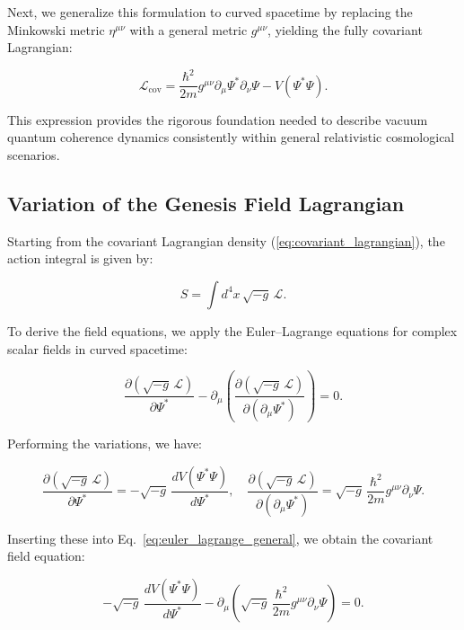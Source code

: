 Next, we generalize this formulation to curved spacetime by replacing the Minkowski metric $\eta^{\mu\nu}$ with a general metric $g^{\mu\nu}$, yielding the fully covariant Lagrangian:

\begin{equation}
\mathcal{L}_{\text{cov}} = \frac{\hbar^2}{2m}g^{\mu\nu}\partial_\mu\Psi^*\partial_\nu\Psi - V(\Psi^*\Psi).
\label{eq:covariant_lagrangian}
\end{equation}

This expression provides the rigorous foundation needed to describe vacuum quantum coherence dynamics consistently within general relativistic cosmological scenarios.

\subsection{Variation of the Genesis Field Lagrangian}

Starting from the covariant Lagrangian density (\ref{eq:covariant_lagrangian}), the action integral is given by:

\begin{equation}
S = \int d^4x \,\sqrt{-g}\,\mathcal{L}.
\label{eq:action_covariant}
\end{equation}

To derive the field equations, we apply the Euler–Lagrange equations for complex scalar fields in curved spacetime:

\begin{equation}
\frac{\partial (\sqrt{-g}\,\mathcal{L})}{\partial \Psi^*} - \partial_\mu \left(\frac{\partial (\sqrt{-g}\,\mathcal{L})}{\partial (\partial_\mu \Psi^*)}\right) = 0.
\label{eq:euler_lagrange_general}
\end{equation}

Performing the variations, we have:

\begin{equation}
\frac{\partial(\sqrt{-g}\,\mathcal{L})}{\partial \Psi^*} = -\sqrt{-g}\,\frac{dV(\Psi^*\Psi)}{d\Psi^*}, \quad
\frac{\partial(\sqrt{-g}\,\mathcal{L})}{\partial(\partial_\mu \Psi^*)} = \sqrt{-g}\,\frac{\hbar^2}{2m}g^{\mu\nu}\partial_\nu\Psi.
\label{eq:variations}
\end{equation}

Inserting these into Eq.~\eqref{eq:euler_lagrange_general}, we obtain the covariant field equation:

\begin{equation}
-\sqrt{-g}\,\frac{dV(\Psi^*\Psi)}{d\Psi^*} - \partial_\mu\left(\sqrt{-g}\,\frac{\hbar^2}{2m}g^{\mu\nu}\partial_\nu\Psi\right) = 0.
\label{eq:euler_lagrange}
\end{equation}

